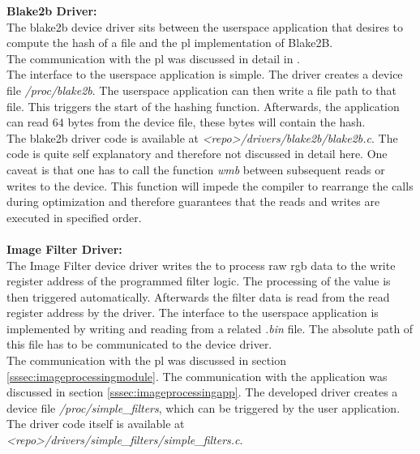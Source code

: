 
\textbf{Blake2b Driver:}\\
The blake2b device driver sits between the userspace application that desires to
compute the hash of a file and the \gls{pl} implementation of Blake2B.\\
The communication with the \gls{pl} was discussed in detail in
.\\
The interface to the userspace application is simple.
The driver creates a device file \emph{/proc/blake2b}.
The userspace application can then write a file path to that file.
This triggers the start of the hashing function.
Afterwards, the application can read $64$ bytes from the device file, these
bytes will contain the hash.\\
The blake2b driver code is available at \emph{<repo>/drivers/blake2b/blake2b.c}.
The code is quite self explanatory and therefore not discussed in detail here.
One caveat is that one has to call the function \emph{wmb} between subsequent
reads or writes to the device.
This function will impede the compiler to rearrange the calls during
optimization and therefore guarantees that the reads and writes are executed in
specified order.
\\\\
\textbf{Image Filter Driver:}\\
The Image Filter device driver writes the to process raw \gls{rgb} data to the write register address of the programmed filter logic. The processing of the value is then triggered automatically. Afterwards the filter data is read from the read register address by the driver. The interface to the userspace application is implemented by writing and reading from a related \emph{.bin} file. The absolute path of this file has to be communicated to the device driver.\\
The communication with the \gls{pl} was discussed in section \ref{sssec:imageprocessingmodule}. The communication with the application was discussed in section \ref{sssec:imageprocessingapp}. The developed driver creates a device file \emph{/proc/simple_filters}, which can be triggered by the user application. The driver code itself is available at \emph{<repo>/drivers/simple_filters/simple_filters.c}.
